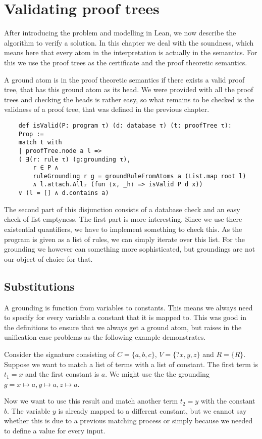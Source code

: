 \section{Validating proof trees}\label{sec:valTree}

After introducing the problem and modelling in Lean, we now describe the algorithm to verify a solution. In this chapter we deal with the soundness, which means here that every atom in the interpretation is actually in the semantics. For this we use the proof trees as the certificate and the proof theoretic semantics.

A ground atom is in the proof theoretic semantics if there exists a valid proof tree, that has this ground atom as its head. We were provided with all the proof trees and checking the heads is rather easy, so what remains to be checked is the validness of a proof tree, that was defined in the previous chapter.

\begin{lstlisting}
    def isValid(P: program τ) (d: database τ) (t: proofTree τ): 
    Prop :=
    match t with
    | proofTree.node a l => 
    ( ∃(r: rule τ) (g:grounding τ), 
        r ∈ P ∧ 
        ruleGrounding r g = groundRuleFromAtoms a (List.map root l)
        ∧ l.attach.All₂ (fun ⟨x, _h⟩ => isValid P d x)) 
    ∨ (l = [] ∧ d.contains a)
\end{lstlisting}

The second part of this disjunction consists of a database check and an easy check of list emptyness. The first part is more interesting. Since we use there existential quantifiers, we have to implement something to check this. As the program is given as a list of rules, we can simply iterate over this list. For the grounding we however can something more sophisticated, but groundings are not our object of choice for that.


\subsection{Substitutions}
    A grounding is function from variables to constants. This means we always need to specify for every variable a constant that it is mapped to. This was good in the definitions to ensure that we always get a ground atom, but raises in the unification case problems as the following example demonstrates.

    \begin{example}
        Consider the signature consisting of $C = \{a,b,c\}$, $V = \{?x,y,z \}$ and $R = \{R\}$. Suppose we want to match a list of terms with a list of constant. The first term is $t_1 = x$ and the first constant is $a$. We might use the the grounding $g = x \mapsto a, y \mapsto a, z \mapsto a$.

        Now we want to use this result and match another term $t_2 = y$ with the constant $b$. The variable $y$ is already mapped to a different constant, but we cannot say whether this is due to a previous matching process or simply because we needed to define a value for every input.
        

        
    \end{example}


